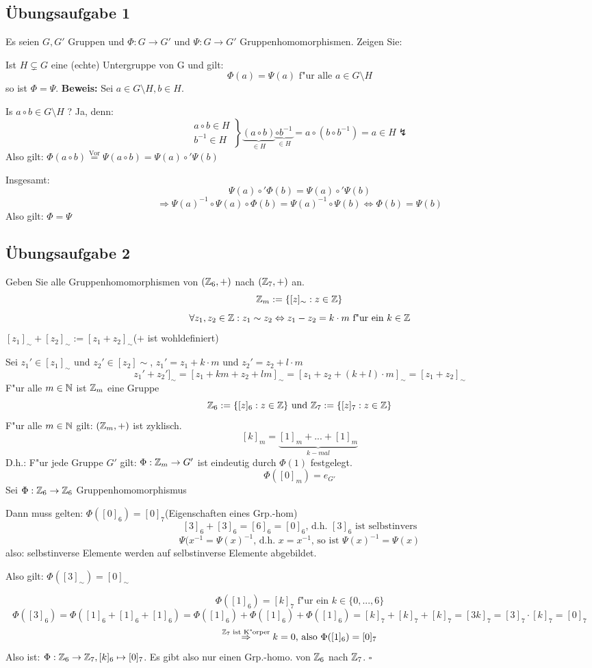 \documentclass[a4paper,twoside,DIV15,BCOR12mm]{scrbook}
\newcommand{\RA}{\Rightarrow}
\newcommand{\LRA}{\Leftrightarrow}
\newcommand{\x}{\cdot}
\newcommand{\error}{\lightning}
\newenvironment{bew}{\pagebreak[2]\textbf{Beweis: }}{\qed}
\renewcommand{\qed}{\hspace*{\fill} \ensuremath{\square}}
\begin{document}
\subsection {Übungsaufgabe 1}
Es seien $G,G'$ Gruppen und $\Phi:G\to G'$ und $\Psi:G\to G'$ Gruppenhomomorphismen. Zeigen Sie:\par
Ist $H\subsetneq G$ eine (echte) Untergruppe von G und gilt:
\[\Phi(a)=\Psi(a)\text{ f"ur alle }a\in G\setminus H\]
so ist $\Phi=\Psi$.
\begin{bew} Sei $a\in G\setminus H, b\in H.$\par
Is $a\circ b\in G\setminus H$ ? Ja, denn:
\[\left.\begin{array}{c}a\circ b\in H\\b^{-1}\in H\end{array}\right\}\underbrace{(a\circ b)}_{\in H}\underbrace{\circ b^{-1}}_{\in H}=a\circ(b\circ b^{-1})=a\in H\error\]
Also gilt: $\Phi(a\circ b)\overset{\text{Vor}}=\Psi(a\circ b)=\Psi(a)\circ'\Psi(b)$\par
Insgesamt: 
\[\Psi(a)\circ'\Phi(b)=\Psi(a)\circ'\Psi(b)\]
\[\RA\Psi(a)^{-1}\circ\Psi(a)\circ\Phi(b)=\Psi(a)^{-1}\circ\Psi(b)\LRA\Phi(b)=\Psi(b)\]
Also gilt: $\Phi=\Psi$
\subsection {Übungsaufgabe 2}
Geben Sie alle Gruppenhomomorphismen von $(\mathbb{Z}_6,+)$ nach $(\mathbb{Z}_7,+)$ an.
\[\mathbb{Z}_m:=\{[z]_\sim: z\in\mathbb{Z}\}\]
\[\forall z_1,z_2\in\MdZ: z_1\sim z_2\LRA z_1-z_2=k\x m\text{ f"ur ein }k\in\MdZ\]
$[z_1]_\sim+[z_2]_\sim:=[z_1+z_2]_\sim$\quad($+$ ist wohldefiniert)\par
Sei $z_1'\in[z_1]_\sim$ und $z_2'\in[z_2]\sim$, $z_1'=z_1+k\x m$ und $z_2'=z_2+l\x m$
\[z_1'+z_2']_\sim = [z_1+km+z_2+lm]_\sim=[z_1+z_2+(k+l)\x m]_\sim=[z_1+z_2]_\sim\]
F"ur alle $m\in\mathbb{N}$ ist $\mathbb{Z}_m$ eine Gruppe
\[\mathbb{Z}_6:=\{[z]_6:z\in\mathbb{Z}\}\text{ und }\mathbb{Z}_7:=\{[z]_7:z\in\mathbb{Z}\}\]
F"ur alle $m\in\mathbb{N}$ gilt: $(\mathbb{Z}_m,+)$ ist zyklisch.
\[[k]_m=\underbrace{[1]_m+...+[1]_m}_{k-mal}\]
D.h.: F"ur jede Gruppe $G'$ gilt: $\Phi:\mathbb{Z}_m\to G'$ ist eindeutig durch $\Phi(1)$ festgelegt.
\[\Phi([0]_m)=e_{G'}\]
Sei $\Phi:\mathbb{Z}_6\to\mathbb{Z}_6$ Gruppenhomomorphismus\par
Dann muss gelten: $\Phi([0]_6)=[0]_7$\quad(Eigenschaften eines Grp.-hom)
\[[3]_6+[3]_6=[6]_6=[0]_6\text{, d.h. }[3]_6\text{ ist selbstinvers}\]
\[\Psi(x^{-1}=\Psi(x)^{-1}\text{, d.h. }x=x^{-1}\text{, so ist }\Psi(x)^{-1}=\Psi(x)\]
also: selbstinverse Elemente werden auf selbstinverse Elemente abgebildet.\par
Also gilt: $\Phi([3]_\sim)=[0]_\sim$\par
\[\Phi([1]_6)=[k]_7\text{ f"ur ein }k\in\{0,...,6\}\]
\[\Phi([3]_6)=\Phi([1]_6+[1]_6+[1]_6)=\Phi([1]_6)+\Phi([1]_6)+\Phi([1]_6)=[k]_7+[k]_7+[k]_7=[3k]_7=[3]_7\x[k]_7=[0]_7\]
\[\overset{\MdZ_7\text{ ist K"orper}}\RA k=0\text{, also }\Phi([1]_6)=[0]_7\]
Also ist:  $\Phi:\mathbb{Z}_6\to\mathbb{Z}_7, [k]_6\mapsto[0]_7$. Es gibt also nur einen Grp.-homo. von $\mathbb{Z}_6$ nach $\mathbb{Z}_7$.
\end{bew}

% 
\end{document}
